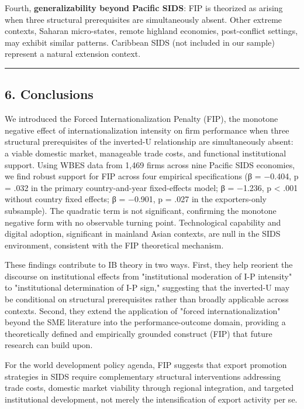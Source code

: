 \documentclass[12pt,a4paper]{article}
\begin{document}
Fourth, \textbf{generalizability beyond Pacific SIDS}: FIP is theorized
as arising when three structural prerequisites are simultaneously
absent. Other extreme contexts, Saharan micro-states, remote highland
economies, post-conflict settings, may exhibit similar patterns.
Caribbean SIDS (not included in our sample) represent a natural
extension context.

\begin{center}\rule{0.5\linewidth}{0.5pt}\end{center}

\hypertarget{6-conclusions}{%
\subsection{6. Conclusions}\label{6-conclusions}}

We introduced the Forced Internationalization Penalty (FIP), the
monotone negative effect of internationalization intensity on firm
performance when three structural prerequisites of the inverted-U
relationship are simultaneously absent: a viable domestic market,
manageable trade costs, and functional institutional support. Using WBES
data from 1,469 firms across nine Pacific SIDS economies, we find robust
support for FIP across four empirical specifications (β = −0.404, p =
.032 in the primary country-and-year fixed-effects model; β = −1.236, p
\textless{} .001 without country fixed effects; β = −0.901, p = .027 in
the exporters-only subsample). The quadratic term is not significant,
confirming the monotone negative form with no observable turning point.
Technological capability and digital adoption, significant in mainland
Asian contexts, are null in the SIDS environment, consistent with the
FIP theoretical mechanism.

These findings contribute to IB theory in two ways. First, they help
reorient the discourse on institutional effects from "institutional
moderation of I-P intensity" to "institutional determination of I-P
sign," suggesting that the inverted-U may be conditional on structural
prerequisites rather than broadly applicable across contexts. Second,
they extend the application of "forced internationalization" beyond the
SME literature into the performance-outcome domain, providing a
theoretically defined and empirically grounded construct (FIP) that
future research can build upon.

For the world development policy agenda, FIP suggests that export
promotion strategies in SIDS require complementary structural
interventions addressing trade costs, domestic market viability through
regional integration, and targeted institutional development, not merely
the intensification of export activity per se.
\end{document}

